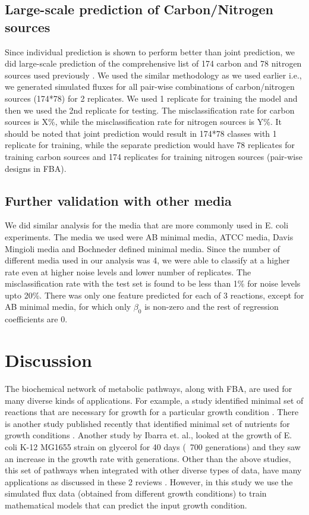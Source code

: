 \documentclass[12pt]{article}
\begin{document}
\bigskip
\subsection*{Large-scale prediction of Carbon/Nitrogen sources}
Since individual prediction is shown to perform better than joint prediction, we did large-scale prediction of the comprehensive list of 174 carbon and 78 nitrogen sources used previously \cite{Feistetal2007}. We used the similar methodology as we used earlier i.e., we generated simulated fluxes for all pair-wise combinations of carbon/nitrogen sources (174*78) for 2 replicates. We used 1 replicate for training the model and then we used the 2nd replicate for testing. The misclassification rate for carbon sources is X\%, while the misclassification rate for nitrogen sources is Y\%.  It should be noted that joint prediction would result in 174*78 classes with 1 replicate for training, while the separate prediction would have 78 replicates for training carbon sources and 174 replicates for training nitrogen sources (pair-wise designs in FBA).

\bigskip
\subsection*{Further validation with other media}
We did similar analysis for the media that are more commonly used in E. coli experiments. The media we used were AB minimal media, ATCC media, Davis Mingioli media and Bochneder defined minimal media. Since the number of different media used in our analysis was 4, we were able to classify at a higher rate even at higher noise levels and lower number of replicates. The misclassification rate with the test set is found to be less than 1\% for noise levels upto 20\%. There was only one feature predicted for each of 3 reactions, except for AB minimal media, for which only $\beta_0$ is non-zero and the rest of regression coefficients are 0. 

\section*{Discussion}
The biochemical network of metabolic pathways, along with FBA, are used for many diverse kinds of applications. For example, a study identified minimal set of reactions that are necessary for growth for a particular growth condition \cite{Burgardetal2001}. There is another study published recently that identified minimal set of nutrients for growth conditions \cite{Ekeretal2013}. Another study by Ibarra et. al., \cite{Ibarraetal2002} looked at the growth of E. coli K-12 MG1655 strain on glycerol for 40 days (~700 generations) and they saw an increase in the growth rate with generations. Other than the above studies, this set of pathways when integrated with other diverse types of data, have many applications as discussed in these 2 reviews \cite{Hydukeetal2013,Oberhardtetal2009}. However, in this study we use the simulated flux data (obtained from different growth conditions) to train mathematical models that can predict the input growth condition.
\end{document}
